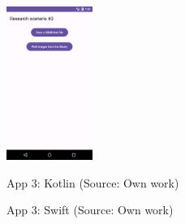 \begin{figure}[H]
  \begin{minipage}{.47\textwidth}
    \centering
    \includegraphics[height=50mm]{img/app3_kotlin}
    \caption{App 3: Kotlin (Source: Own work)}
    \label{fig:app3_kotlin}
  \end{minipage}
  \hfill
  \begin{minipage}{.47\textwidth}
    \centering
    \caption{App 3: Swift (Source: Own work)}
    \label{fig:app3_swift}
  \end{minipage}
\end{figure}

